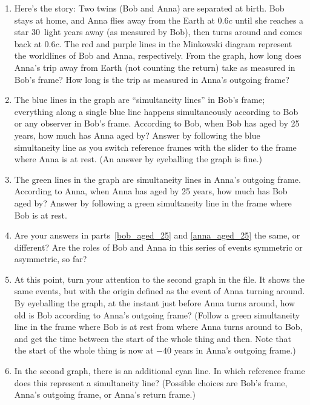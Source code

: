 \begin{enumerate}[wide]
\item Here's the story: Two twins (Bob and Anna) are separated at birth. Bob stays at home, and Anna flies away from the Earth at $0.6c$ until she reaches a star 30~light years away (as measured by Bob), then turns around and comes back at $0.6c$. The red and purple lines in the Minkowski diagram represent the worldlines of Bob and Anna, respectively. From the graph, how long does Anna's trip away from Earth (not counting the return) take as measured in Bob's frame? How long is the trip as measured in Anna's outgoing frame?
\answerspace{0.8in}

\item The blue lines in the graph are ``simultaneity lines'' in Bob's frame; everything along a single blue line happens simultaneously according to Bob or any observer in Bob's frame. According to Bob, when Bob has aged by 25 years, how much has Anna aged by? Answer by following the blue simultaneity line as you switch reference frames with the slider to the frame where Anna is at rest. (An answer by eyeballing the graph is fine.) \label{bob_aged_25}
\answerspace{0.8in}

\item The green lines in the graph are simultaneity lines in Anna's outgoing frame. According to Anna, when Anna has aged by 25 years, how much has Bob aged by?  Answer by following a green simultaneity line in the frame where Bob is at rest. \label{anna_aged_25}
\answerspace{0.8in}

\item Are your answers in parts~\ref{bob_aged_25} and \ref{anna_aged_25} the same, or different? Are the roles of Bob and Anna in this series of events symmetric or asymmetric, so far?
\answerspace{0.8in}

\item At this point, turn your attention to the second graph in the file. It shows the same events, but with the origin defined as the event of Anna turning around. By eyeballing the graph, at the instant just before Anna turns around, how old is Bob according to Anna's outgoing frame? (Follow a green simultaneity line in the frame where Bob is at rest from where Anna turns around to Bob, and get the time between the start of the whole thing and then.  Note that the start of the whole thing is now at $-40$ years in Anna's outgoing frame.)
\answerspace{0.8in}

\item In the second graph, there is an additional cyan line. In which reference frame does this represent a simultaneity line?  (Possible choices are Bob's frame, Anna's outgoing frame, or Anna's return frame.)
\answerspace{0.8in}


\end{enumerate}
